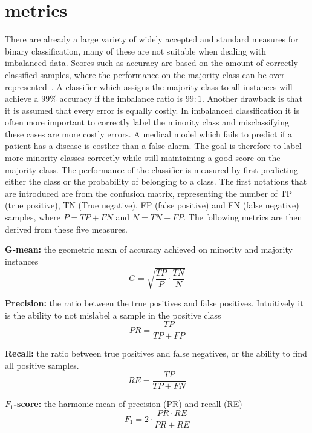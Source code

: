\section{metrics}
There are already a large variety of widely accepted and standard measures for binary classification, many of these are not suitable when dealing with imbalanced data. Scores such as accuracy are based on the amount of correctly classified samples, where the performance on the majority class can be over represented~\cite{Fernandez2018LearningSets}. A classifier which assigns the majority class to all instances will achieve a $99\%$ accuracy if the imbalance ratio is $99:1$. Another drawback is that it is assumed that every error is equally costly. In imbalanced classification it is often more important to correctly label the minority class and misclassifying these cases are more costly errors. A medical model which fails to predict if a patient has a disease is costlier than a false alarm. The goal is therefore to label more minority classes correctly while still maintaining a good score on the majority class. The performance of the classifier is measured by first predicting either the class or the probability of belonging to a class. The first notations that are introduced are from the confusion matrix, representing the number of TP (true positive), TN (True negative), FP (false positive) and FN (false negative) samples, where $P = TP + FN$ and $N = TN + FP$. The following metrics are then derived from these five measures.

\textbf{G-mean:} the geometric mean of accuracy achieved on minority and majority instances
\begin{equation}
    G = \sqrt{\frac{TP}{P} \cdot \frac{TN}{N}}
\end{equation}

\textbf{Precision:} the ratio between the true positives and false positives. Intuitively it is the ability to not mislabel a sample in the positive class
\begin{equation}
    PR = \frac{TP}{TP + FP}
\end{equation}

\textbf{Recall:} the ratio between true positives and false negatives, or the ability to find all positive samples.
\begin{equation}
    RE = \frac{TP}{TP + FN}
\end{equation}

\textbf{$F_1$-score:} the harmonic mean of precision (PR) and recall (RE)
\begin{equation}
    F_1 = 2 \cdot \frac{PR \cdot RE}{PR + RE}
\end{equation}

